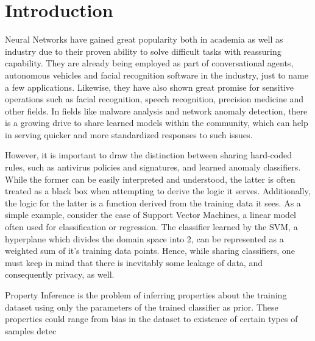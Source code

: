 \chapter{Introduction}
Neural Networks have gained great popularity both in academia as well as industry due to their proven ability to solve difficult tasks with reassuring capability. They are already being employed as part of conversational agents, autonomous vehicles and facial recognition software in the industry, just to name a few applications. Likewise, they have also shown great promise for sensitive operations such as facial recognition, speech recognition, precision medicine and other fields. In fields like malware analysis and network anomaly detection, there is a growing drive to share learned models within the community, which can help in serving quicker and more standardized responses to such issues. 

However, it is important to draw the distinction between sharing hard-coded rules, such as antivirus policies and signatures, and learned anomaly classifiers. While the former can be easily interpreted and understood, the latter is often treated as a black box when attempting to derive the logic it serves. Additionally, the logic for the latter is a function derived from the training data it sees. As a simple example, consider the case of Support Vector Machines, a linear model often used for classification or regression. The classifier learned by the SVM, a hyperplane which divides the domain space into 2, can be represented as a weighted sum of it's training data points. Hence, while sharing classifiers, one must keep in mind that there is inevitably some leakage of data, and consequently privacy, as well.

Property Inference is the problem of inferring properties about the training dataset using only the parameters of the trained classifier as prior. These properties could range from bias in the dataset to existence of certain types of samples detec